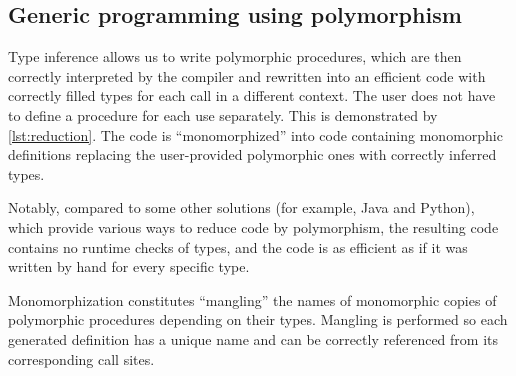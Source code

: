 \subsection{Generic programming using polymorphism}
\label{sec:reduction}

Type inference allows us to write polymorphic procedures, which are then correctly interpreted by the compiler and rewritten into an efficient code with correctly filled types for each call in a different context. The user does not have to define a procedure for each use separately. This is demonstrated by \cref{lst:reduction}. The code is ``monomorphized'' into code containing monomorphic definitions replacing the user-provided polymorphic ones with correctly inferred types.

Notably, compared to some other solutions (for example, Java and Python), which provide various ways to reduce code by polymorphism, the resulting code contains no runtime checks of types, and the code is as efficient as if it was written by hand for every specific type.

Monomorphization constitutes ``mangling'' the names of monomorphic copies of polymorphic procedures depending on their types. Mangling is performed so each generated definition has a unique name and can be correctly referenced from its corresponding call sites.

